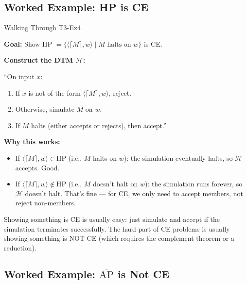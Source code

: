 \documentclass[11pt,a4paper]{article}
\newcommand{\keytakeaway}[1]{%
  \par\vspace{0.3em}%
  \colorbox{yellow!60}{\parbox{\dimexpr\linewidth-2\fboxsep}{#1}}%
  \vspace{0.3em}}
\begin{document}
\subsection{Worked Example: HP is CE}

\begin{examplebox}{Walking Through T3-Ex4}

\textbf{Goal:} Show HP $= \{\langle \lceil M \rceil, w \rangle \mid M \text{ halts on } w\}$ is CE.

\textbf{Construct the DTM $\mathcal{H}$:}

``On input $x$:
\begin{enumerate}
    \item If $x$ is not of the form $\langle \lceil M \rceil, w \rangle$, reject.
    \item Otherwise, simulate $M$ on $w$.
    \item If $M$ halts (either accepts or rejects), then accept.''
\end{enumerate}

\textbf{Why this works:}
\begin{itemize}
    \item If $\langle \lceil M \rceil, w \rangle \in \text{HP}$ (i.e., $M$ halts on $w$): the simulation eventually halts, so $\mathcal{H}$ accepts. Good.
    \item If $\langle \lceil M \rceil, w \rangle \notin \text{HP}$ (i.e., $M$ doesn't halt on $w$): the simulation runs forever, so $\mathcal{H}$ doesn't halt. That's fine --- for CE, we only need to accept members, not reject non-members.
\end{itemize}

\keytakeaway{Showing something is CE is usually easy: just simulate and accept if the simulation terminates successfully. The hard part of CE problems is usually showing something is NOT CE (which requires the complement theorem or a reduction).}
\end{examplebox}

\subsection{Worked Example: $\overline{\text{AP}}$ is Not CE}
\end{document}
